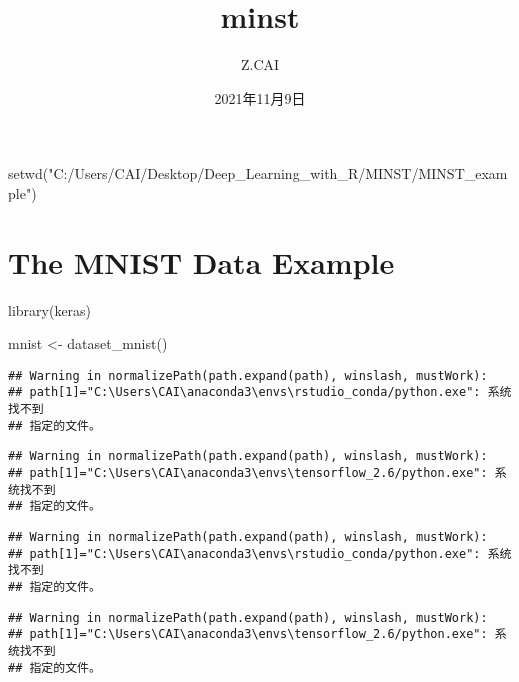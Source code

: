 \documentclass[]{article}
\title{minst}
\author{Z.CAI}
\date{2021年11月9日}
\newenvironment{Shaded}{\begin{snugshade}}{\end{snugshade}}
\newcommand{\FunctionTok}[1]{\textcolor[rgb]{0.00,0.00,0.00}{#1}}
\newcommand{\NormalTok}[1]{#1}
\newcommand{\OtherTok}[1]{\textcolor[rgb]{0.56,0.35,0.01}{#1}}
\newcommand{\StringTok}[1]{\textcolor[rgb]{0.31,0.60,0.02}{#1}}
\begin{document}
\maketitle

\begin{Shaded}
\begin{Highlighting}[]
\FunctionTok{setwd}\NormalTok{(}\StringTok{"C:/Users/CAI/Desktop/Deep\_Learning\_with\_R/MINST/MINST\_example"}\NormalTok{)}
\end{Highlighting}
\end{Shaded}

\hypertarget{the-mnist-data-example}{%
\section{The MNIST Data Example}\label{the-mnist-data-example}}

\begin{Shaded}
\begin{Highlighting}[]
\FunctionTok{library}\NormalTok{(keras)}

\NormalTok{mnist }\OtherTok{\textless{}{-}} \FunctionTok{dataset\_mnist}\NormalTok{()}
\end{Highlighting}
\end{Shaded}

\begin{verbatim}
## Warning in normalizePath(path.expand(path), winslash, mustWork):
## path[1]="C:\Users\CAI\anaconda3\envs\rstudio_conda/python.exe": 系统找不到
## 指定的文件。
\end{verbatim}

\begin{verbatim}
## Warning in normalizePath(path.expand(path), winslash, mustWork):
## path[1]="C:\Users\CAI\anaconda3\envs\tensorflow_2.6/python.exe": 系统找不到
## 指定的文件。
\end{verbatim}

\begin{verbatim}
## Warning in normalizePath(path.expand(path), winslash, mustWork):
## path[1]="C:\Users\CAI\anaconda3\envs\rstudio_conda/python.exe": 系统找不到
## 指定的文件。
\end{verbatim}

\begin{verbatim}
## Warning in normalizePath(path.expand(path), winslash, mustWork):
## path[1]="C:\Users\CAI\anaconda3\envs\tensorflow_2.6/python.exe": 系统找不到
## 指定的文件。
\end{verbatim}
\end{document}

